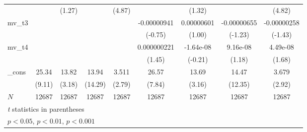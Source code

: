 {\begin{tabular}{l*{8}{c}}
            &                     &      (1.27)         &                     &      (4.87)         &                     &      (1.32)         &                     &      (4.82)         \\
[1em]
mv\_t3       &                     &                     &                     &                     & -0.00000941         &  0.00000601         & -0.00000655         & -0.00000258         \\
            &                     &                     &                     &                     &     (-0.75)         &      (1.00)         &     (-1.23)         &     (-1.43)         \\
[1em]
mv\_t4       &                     &                     &                     &                     & 0.000000221         &   -1.64e-08         &    9.16e-08         &    4.49e-08         \\
            &                     &                     &                     &                     &      (1.45)         &     (-0.21)         &      (1.18)         &      (1.68)         \\
[1em]
\_cons      &       25.34\sym{***}&       13.82\sym{**} &       13.94\sym{***}&       3.511\sym{**} &       26.57\sym{***}&       13.69\sym{**} &       14.47\sym{***}&       3.679\sym{**} \\
            &      (9.11)         &      (3.18)         &     (14.29)         &      (2.79)         &      (7.84)         &      (3.16)         &     (12.35)         &      (2.92)         \\
\hline
\(N\)       &       12687         &       12687         &       12687         &       12687         &       12687         &       12687         &       12687         &       12687         \\
\hline\hline
\multicolumn{9}{l}{\footnotesize \textit{t} statistics in parentheses}\\
\multicolumn{9}{l}{\footnotesize \sym{*} \(p<0.05\), \sym{**} \(p<0.01\), \sym{***} \(p<0.001\)}\\
\end{tabular}
}
